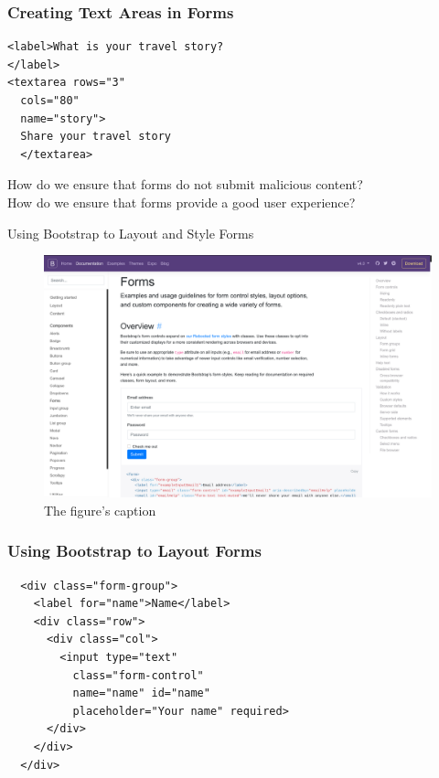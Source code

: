 \documentclass[14pt,aspectratio=169]{beamer}
\begin{document}
%
\begin{frame}[fragile]
  \frametitle{Creating Text Areas in Forms}
  \normalsize
  \begin{minipage}{6in}
    \vspace*{.1in}
    \begin{verbatim}
<label>What is your travel story?
</label>
<textarea rows="3"
  cols="80"
  name="story">
  Share your travel story
  </textarea>
    \end{verbatim}
  \end{minipage}
  \vspace*{.05in}
  \begin{center}
    \noindent How do we ensure that forms do not submit malicious content? \\
    \noindent How do we ensure that forms provide a good user experience? \\
  \end{center}
\end{frame}

%
\begin{frame}{Using Bootstrap to Layout and Style Forms}
  \begin{figure}
    \centering
    \includegraphics[scale=.08]{images/bootstrapforms.png}
    \caption{The figure's caption}
  \end{figure}
\end{frame}

%
\begin{frame}[fragile]
  \frametitle{Using Bootstrap to Layout Forms}
  \normalsize
  \begin{minipage}{6in}
    \vspace*{.1in}
    \begin{verbatim}
  <div class="form-group">
    <label for="name">Name</label>
    <div class="row">
      <div class="col">
        <input type="text"
          class="form-control"
          name="name" id="name"
          placeholder="Your name" required>
      </div>
    </div>
  </div>
    \end{verbatim}
  \end{minipage}
\end{frame}
\end{document}
